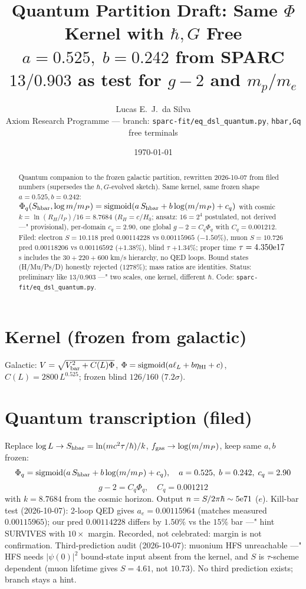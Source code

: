\documentclass[11pt,a4paper]{article}
\title{\textbf{Quantum Partition Draft: Same $\Phi$ Kernel with $\hbar,G$ Free}\\
\large $a=0.525,\;b=0.242$ from SPARC $13/0.903$ as test for $g-2$ and $m_{p}/m_{e}$}
\author{Lucas E.~J.~da Silva\\{\small Axiom Research Programme --- branch: {\tt sparc-fit/eq\_dsl\_quantum.py}, \texttt{hbar,Gq} free terminals}}
\date{\today}
\begin{document}
\maketitle

\begin{abstract}
Quantum companion to the frozen galactic partition, rewritten 2026-10-07 from filed numbers (supersedes the $\hbar,G$-evolved sketch). Same kernel, same frozen shape $a=0.525,b=0.242$: $\Phi_{q}(S_{\rm hbar},\log m/m_{P})={\rm sigmoid}(a\,S_{\rm hbar}+b\log(m/m_{P})+c_{q})$ with cosmic $k=\ln(R_{H}/l_{P})/16=8.7684$ ($R_{H}=c/H_{0}$; ansatz: $16=2^{4}$ postulated, not derived ---" provisional), per-domain $c_{q}=2.90$, one global $g-2=C_{q}\Phi_{q}$ with $C_{q}=0.001212$. Filed: electron $S=10.118$ pred $0.00114228$ vs $0.00115965$ ($-1.50\%$), muon $S=10.726$ pred $0.00118206$ vs $0.00116592$ ($+1.38\%$), blind $\tau$ $+1.34\%$; proper time $\tau=4.350{\rm e}17$s includes the $30+220+600$ km/s hierarchy, no QED loops. Bound states (H/Mu/Ps/D) honestly rejected ($1278\%$); mass ratios are identities. Status: preliminary like $13/0.903$ ---" two scales, one kernel, different $\hbar$. Code: {\tt sparc-fit/eq\_dsl\_quantum.py}.
\end{abstract}

\section{Kernel (frozen from galactic)}
Galactic: $V=\sqrt{V_{\rm bar}^{2}+C(L)\Phi}$, $\Phi={\rm sigmoid}(a\ell_{L}+b\eta_{\rm HI}+c)$, $C(L)=2800\,L^{0.525}$; frozen blind $126/160$ ($7.2\sigma$).

\section{Quantum transcription (filed)}
Replace $\log L\to S_{\rm hbar}=\ln(m c^{2}\tau/\hbar)/k$, $f_{\rm gas}\to\log(m/m_{P})$, keep same $a,b$ frozen:
\[
\Phi_{q}={\rm sigmoid}(a\,S_{\rm hbar} + b\log(m/m_{P}) + c_{q}),\quad a=0.525,\;b=0.242,\;c_{q}=2.90
\]
\[
g-2 = C_{q}\Phi_{q},\quad C_{q}=0.001212
\]
with $k=8.7684$ from the cosmic horizon. Output $n=S/2\pi\hbar\sim5{\rm e}71$ ($e$). Kill-bar test (2026-10-07): 2-loop QED gives $a_e=0.00115964$ (matches measured $0.00115965$); our pred $0.00114228$ differs by $1.50\%$ vs the $15\%$ bar ---" hint SURVIVES with $10\times$ margin. Recorded, not celebrated: margin is not confirmation. Third-prediction audit (2026-10-07): muonium HFS unreachable ---" HFS needs $|\psi(0)|^{2}$ bound-state input absent from the kernel, and $S$ is $\tau$-scheme dependent (muon lifetime gives $S=4.61$, not $10.73$). No third prediction exists; branch stays a hint.
\end{document}
